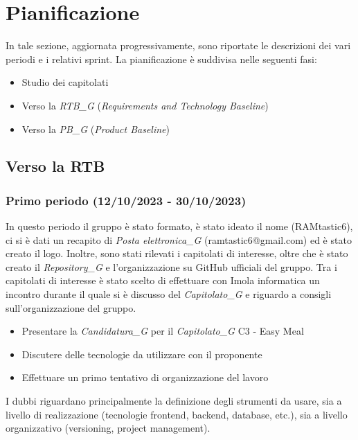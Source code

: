 \section{Pianificazione}
In tale sezione, aggiornata progressivamente, sono riportate le descrizioni dei vari periodi e i relativi sprint.
La pianificazione è suddivisa nelle seguenti fasi:
\begin{itemize}
    \item Studio dei capitolati
    \item Verso la \textit{RTB_G} (\emph{Requirements and Technology Baseline})
    \item Verso la \textit{PB_G} (\emph{Product Baseline})
\end{itemize}
\subsection{Verso la RTB}

\subsubsection{Primo periodo (12/10/2023 - 30/10/2023)}

In questo periodo il gruppo è stato formato, è stato ideato il nome (RAMtastic6), ci si è dati un recapito di \textit{Posta elettronica_G} (ramtastic6@gmail.com) ed è stato creato il logo. Inoltre, sono stati rilevati i capitolati di interesse, oltre che è stato creato il \textit{Repository_G} e l'organizzazione su GitHub ufficiali del gruppo. Tra i capitolati di interesse è stato scelto di effettuare con Imola informatica un incontro durante il quale si è discusso del \textit{Capitolato_G} e riguardo a consigli sull'organizzazione del gruppo. 

\begin{itemize}
    \item Presentare la \textit{Candidatura_G} per il \textit{Capitolato_G} C3 - Easy Meal
    \item Discutere delle tecnologie da utilizzare con il proponente
    \item Effettuare un primo tentativo di organizzazione del lavoro
\end{itemize}

I dubbi riguardano principalmente la definizione degli strumenti da usare, sia a livello di realizzazione (tecnologie frontend,
backend, database, etc.), sia a livello organizzativo (versioning, project management).

